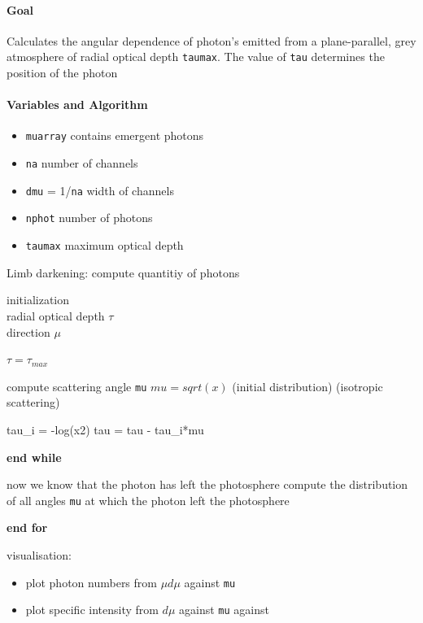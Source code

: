 \documentclass[../main/main.tex]{subfiles}
\begin{document}
\paragraph{Goal}
Calculates the angular dependence of photon's emitted from a plane-parallel, grey atmosphere of radial optical depth \texttt{taumax}. The value of \texttt{tau} determines the position of the photon

\paragraph{Variables and Algorithm}
\begin{itemize}
\item \texttt{muarray} contains emergent photons
\item \texttt{na} number of channels
\item \texttt{dmu} = 1/\texttt{na} width of channels
\item \texttt{nphot} number of photons
\item \texttt{taumax} maximum optical depth
\end{itemize}

\begin{algorithm}
\caption{Limb darkening: compute quantitiy of photons}\label{limb_darkening}
\begin{algorithmic}
\State initialization \\
\quad radial optical depth $\tau$ \\
\quad direction $\mu$


\State $\boxed{\tau = \tau_{max}}$
	
	\State compute scattering angle \texttt{mu}
	 $\boxed{mu = sqrt(x)}$ (initial distribution)
	 (isotropic scattering)
	\EndIf
	
	\State tau\_i = -log(x2) 
	\State tau = tau - tau\_i*mu	
		
	\EndWhile
	\State \textbf{end while}

	\State now we know that the photon has left the photosphere	
	\State compute the distribution of all angles \texttt{mu} at which the photon left the photosphere
	
\EndFor
\State \textbf{end for}

\State visualisation: 
	\begin{itemize}
	\item plot photon numbers from $\mu d\mu$ against \texttt{mu}
	\item plot specific intensity from $d\mu$ against \texttt{mu} against 
	\end{itemize}


\end{algorithmic}
\end{algorithm}
\end{document}
